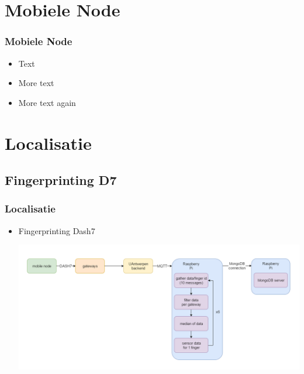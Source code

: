 

\maketitle

\section{Mobiele Node}

\begin{frame}[fragile]
\frametitle{Mobiele Node} 
\begin{itemize}
 \item Text
 \item More text
 \item More text again
\end{itemize}
\end{frame}


\section{Localisatie}

\subsection{Fingerprinting D7}
\begin{frame} 
\frametitle{Localisatie}
\begin{itemize}
\item Fingerprinting Dash7
	\begin{center}
  		\includegraphics[width=\textwidth]{images/Flowchart.png}
	\end{center}
\end{itemize}
\end{frame}

